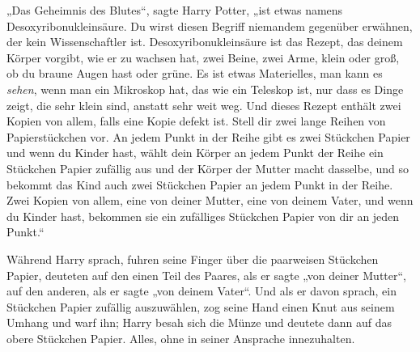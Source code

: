 „Das Geheimnis des Blutes“, sagte Harry Potter, „ist etwas namens Desoxyribonukleinsäure. Du wirst diesen Begriff niemandem gegenüber erwähnen, der kein Wissenschaftler ist. Desoxyribonukleinsäure ist das Rezept, das deinem Körper vorgibt, wie er zu wachsen hat, zwei Beine, zwei Arme, klein oder groß, ob du braune Augen hast oder grüne. Es ist etwas Materielles, man kann es \emph{sehen}, wenn man ein Mikroskop hat, das wie ein Teleskop ist, nur dass es Dinge zeigt, die sehr klein sind, anstatt sehr weit weg. Und dieses Rezept enthält zwei Kopien von allem, falls eine Kopie defekt ist. Stell dir zwei lange Reihen von Papierstückchen vor. An jedem Punkt in der Reihe gibt es zwei Stückchen Papier und wenn du Kinder hast, wählt dein Körper an jedem Punkt der Reihe ein Stückchen Papier zufällig aus und der Körper der Mutter macht dasselbe, und so bekommt das Kind auch zwei Stückchen Papier an jedem Punkt in der Reihe. Zwei Kopien von allem, eine von deiner Mutter, eine von deinem Vater, und wenn du Kinder hast, bekommen sie ein zufälliges Stückchen Papier von dir an jeden Punkt.“

Während Harry sprach, fuhren seine Finger über die paarweisen Stückchen Papier, deuteten auf den einen Teil des Paares, als er sagte „von deiner Mutter“, auf den anderen, als er sagte „von deinem Vater“. Und als er davon sprach, ein Stückchen Papier zufällig auszuwählen, zog seine Hand einen Knut aus seinem Umhang und warf ihn; Harry besah sich die Münze und deutete dann auf das obere Stückchen Papier. Alles, ohne in seiner Ansprache innezuhalten.

